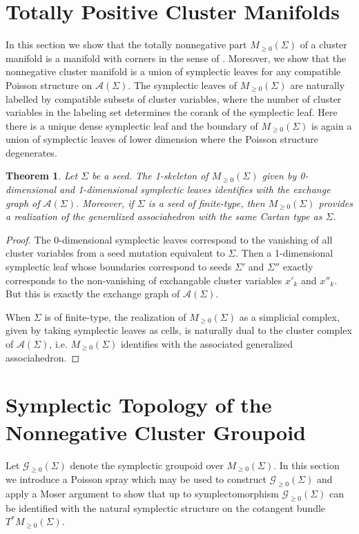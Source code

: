 \documentclass{amsart}
\newtheorem{theorem}{Theorem}[section]
\numberwithin{equation}{section}
\newcommand{\cA}{\mathcal{A}}
\newcommand{\cG}{\mathcal{G}}
\begin{document}
\section{Totally Positive Cluster Manifolds}
In this section we show that the totally nonnegative part $M_{\ge0}(\Sigma)$ of a cluster manifold is a manifold with corners in the sense of \cite{MR3077259}.  
Moreover, we show that the nonnegative cluster manifold is a union of symplectic leaves for any compatible Poisson structure on $\cA(\Sigma)$.  
The symplectic leaves of $M_{\ge0}(\Sigma)$ are naturally labelled by compatible subsets of cluster variables, where the number of cluster variables in the labeling set determines the corank of the symplectic leaf.
Here there is a unique dense symplectic leaf and the boundary of $M_{\ge0}(\Sigma)$ is again a union of symplectic leaves of lower dimension where the Poisson structure degenerates.

\begin{theorem}
  Let $\Sigma$ be a seed.  
  The 1-skeleton of $M_{\ge0}(\Sigma)$ given by 0-dimensional and 1-dimensional symplectic leaves identifies with the exchange graph of $\cA(\Sigma)$.  
  Moreover, if $\Sigma$ is a seed of finite-type, then $M_{\ge0}(\Sigma)$ provides a realization of the generalized associahedron with the same Cartan type as $\Sigma$.
\end{theorem}
\begin{proof}
  The 0-dimensional symplectic leaves correspond to the vanishing of all cluster variables from a seed mutation equivalent to $\Sigma$.  
  Then a 1-dimensional symplectic leaf whose boundaries correspond to seeds $\Sigma'$ and $\Sigma''$ exactly corresponds to the non-vanishing of exchangable cluster variables $x'_k$ and $x''_k$.
  But this is exactly the exchange graph of $\cA(\Sigma)$.

  When $\Sigma$ is of finite-type, the realization of $M_{\ge0}(\Sigma)$ as a simplicial complex, given by taking symplectic leaves as cells, is naturally dual to the cluster complex of $\cA(\Sigma)$, i.e. $M_{\ge0}(\Sigma)$ identifies with the associated generalized associahedron.
\end{proof}

\section{Symplectic Topology of the Nonnegative Cluster Groupoid}
Let $\cG_{\ge0}(\Sigma)$ denote the symplectic groupoid over $M_{\ge0}(\Sigma)$.  
In this section we introduce a Poisson spray which may be used to construct $\cG_{\ge0}(\Sigma)$ and apply a Moser argument to show that up to symplectomorphism $\cG_{\ge0}(\Sigma)$ can be identified with the natural symplectic structure on the cotangent bundle $T^*M_{\ge0}(\Sigma)$.
\end{document}
